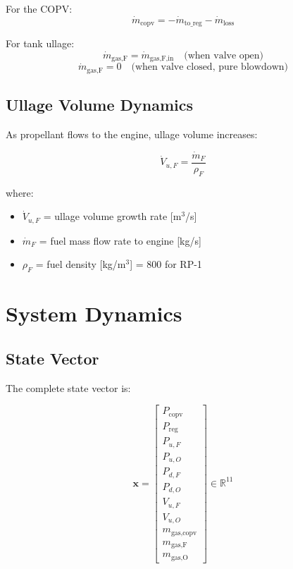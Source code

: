 \documentclass[11pt,a4paper]{article}
\begin{document}
For the COPV:
\begin{equation}
\dot{m}_{\text{copv}} = -\dot{m}_{\text{to\_reg}} - \dot{m}_{\text{loss}}
\end{equation}

For tank ullage:
\begin{equation}
\dot{m}_{\text{gas,F}} = \dot{m}_{\text{gas,F,in}} \quad \text{(when valve open)}
\end{equation}
\begin{equation}
\dot{m}_{\text{gas,F}} = 0 \quad \text{(when valve closed, pure blowdown)}
\end{equation}

\subsection{Ullage Volume Dynamics}

As propellant flows to the engine, ullage volume increases:

\begin{equation}
\dot{V}_{u,F} = \frac{\dot{m}_F}{\rho_F}
\end{equation}

where:
\begin{itemize}
    \item $\dot{V}_{u,F}$ = ullage volume growth rate [m$^3$/s]
    \item $\dot{m}_F$ = fuel mass flow rate to engine [kg/s]
    \item $\rho_F$ = fuel density [kg/m$^3$] = 800 for RP-1
\end{itemize}

\section{System Dynamics}

\subsection{State Vector}

The complete state vector is:

\begin{equation}
\mathbf{x} = \begin{bmatrix}
P_{\text{copv}} \\
P_{\text{reg}} \\
P_{u,F} \\
P_{u,O} \\
P_{d,F} \\
P_{d,O} \\
V_{u,F} \\
V_{u,O} \\
m_{\text{gas,copv}} \\
m_{\text{gas,F}} \\
m_{\text{gas,O}}
\end{bmatrix} \in \mathbb{R}^{11}
\end{equation}
\end{document}
